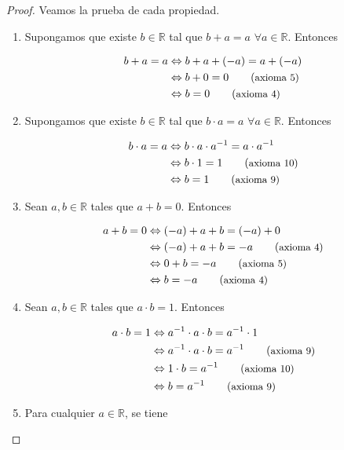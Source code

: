 \documentclass[
  a4paper,
]{scrreport}
\theoremstyle{definition}
\theoremstyle{plain}
\theoremstyle{definition}
\theoremstyle{definition}
\theoremstyle{plain}
\theoremstyle{plain}
\theoremstyle{remark}
\begin{document}
\begin{tcolorbox}[enhanced jigsaw, leftrule=.75mm, colbacktitle=quarto-callout-note-color!10!white, toprule=.15mm, opacityback=0, opacitybacktitle=0.6, toptitle=1mm, breakable, bottomtitle=1mm, colframe=quarto-callout-note-color-frame, rightrule=.15mm, titlerule=0mm, title=\textcolor{quarto-callout-note-color}{\faInfo}\hspace{0.5em}{Demostración}, arc=.35mm, left=2mm, bottomrule=.15mm, colback=white, coltitle=black]

\begin{proof}
Veamos la prueba de cada propiedad.

\begin{enumerate}
\def\labelenumi{\alph{enumi}.}
\item
  Supongamos que existe \(b\in\mathbb{R}\) tal que \(b+a=a\)
  \(\forall a\in\mathbb{R}\). Entonces

  \begin{align*}
   b+a = a &\Leftrightarrow b+a+(-a)=a+(-a) \\
   & \Leftrightarrow b+0 = 0 \tag{\small{axioma 5}}\\
   &\Leftrightarrow b=0 \tag{\small{axioma 4}}
   \end{align*}
\item
  Supongamos que existe \(b\in\mathbb{R}\) tal que \(b\cdot a=a\)
  \(\forall a\in\mathbb{R}\). Entonces

  \begin{align*}
   b\cdot a = a &\Leftrightarrow b\cdot a\cdot a^{-1}=a\cdot a^{-1} \\
   & \Leftrightarrow b\cdot 1 = 1 \tag{\small{axioma 10}}\\
   &\Leftrightarrow b=1 \tag{\small{axioma 9}}
   \end{align*}
\item
  Sean \(a,b\in \mathbb{R}\) tales que \(a+b=0\). Entonces

  \begin{align*}
   a+b=0 &\Leftrightarrow (-a)+a+b = (-a)+0 \\
   &\Leftrightarrow (-a)+a+b = -a  \tag{\small{axioma 4}}\\
   & \Leftrightarrow 0+b=-a \tag{\small{axioma 5}}\\ 
   & \Leftrightarrow b = -a \tag{\small{axioma 4}}
   \end{align*}
\item
  Sean \(a,b\in \mathbb{R}\) tales que \(a\cdot b=1\). Entonces

  \begin{align*}
   a\cdot b=1 &\Leftrightarrow a^{-1}\cdot a\cdot b = a^{-1}\cdot 1 \\
   &\Leftrightarrow a^{-1}\cdot a\cdot b = a^{-1} \tag{\small{axioma 9}} \\
   & \Leftrightarrow 1\cdot b=a^{-1} \tag{\small{axioma 10}}\\ 
   & \Leftrightarrow b = a^{-1} \tag{\small{axioma 9}}
   \end{align*}
\item
  Para cualquier \(a\in\mathbb{R}\), se tiene


\end{enumerate}
\end{proof}
\end{tcolorbox}
\end{document}
